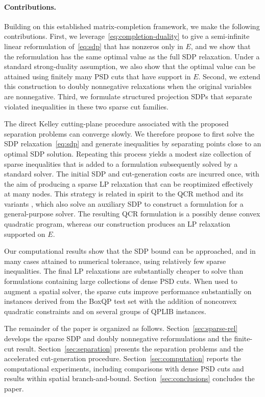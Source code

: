 \documentclass[twoside]{article}
\newcommand{\citep}[1]{\cite{#1}}
\begin{document}
	\paragraph{Contributions.}
	Building on this established matrix-completion framework, we make the following contributions. First, we leverage~\eqref{eq:completion-duality} to give a semi-infinite linear reformulation of~\eqref{eq:sdp} that has nonzeros only in $E$, and we show that the reformulation has the same optimal value as the full SDP relaxation.  Under a standard strong-duality assumption, we also show that the optimal value can be attained using finitely many PSD cuts that have support in $E$. Second, we extend this construction to doubly nonnegative relaxations when the original variables are nonnegative. Third, we formulate structured projection SDPs that separate violated inequalities in these two sparse cut families.
	
	The direct Kelley cutting-plane procedure associated with the proposed separation problems can converge slowly.  We therefore propose to first solve the SDP relaxation~\eqref{eq:sdp} and generate inequalities by separating points close to an optimal SDP solution.  Repeating this process yields a modest size collection of sparse inequalities that is added to a formulation subsequently solved by a standard \BnB solver.  The initial SDP and cut-generation costs are incurred once, with the aim of producing a sparse LP relaxation that can be reoptimized effectively at many nodes. This strategy is related in spirit to the QCR method and its variants \citep{billionnet.elloumi:07,billionnet.elloumi.lambert:12}, which also solve an auxiliary SDP to construct a formulation for a general-purpose solver. The resulting QCR formulation is a possibly dense convex quadratic program, whereas our construction produces an LP relaxation supported on $E$.
	
	Our computational results show that the SDP bound can be approached, and in many cases attained to numerical tolerance, using relatively few sparse inequalities. The final LP relaxations are substantially cheaper to solve than formulations containing large collections of dense PSD cuts. When used to augment a spatial \BnB solver, the sparse cuts improve performance substantially on instances derived from the BoxQP test set with the addition of nonconvex quadratic constraints and on several groups of QPLIB instances.
	
	The remainder of the paper is organized as follows. Section~\ref{sec:sparse-rel} develops the sparse SDP and doubly nonnegative reformulations and the finite-cut result. Section~\ref{sec:separation} presents the separation problems and the accelerated cut-generation procedure. Section~\ref{sec:computation} reports the computational experiments, including comparisons with dense PSD cuts and results within spatial branch-and-bound. Section~\ref{sec:conclusions} concludes the paper.
	
\end{document}
